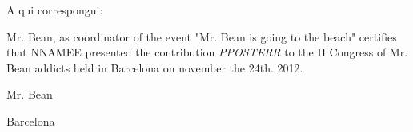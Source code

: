 \documentclass{article}
\begin{document}
\vspace{20pt}
A qui correspongui:
\vspace{20pt}

Mr. Bean, as coordinator of the event "Mr. Bean is going to the beach" certifies that NNAMEE presented the contribution \emph{ PPOSTERR } to the II Congress of Mr. Bean addicts held in Barcelona on november the 24th. 2012.


\vspace{100pt}
\hspace{120pt} %

\vspace{80pt}
\hspace{250pt}Mr. Bean

\hspace{200pt}Barcelona
\end{document}
